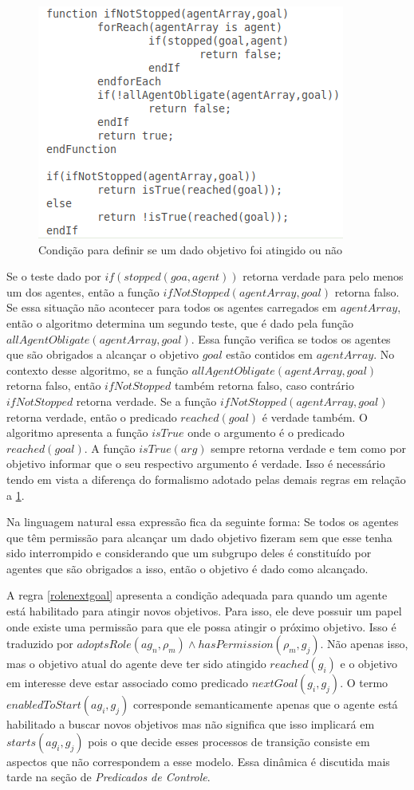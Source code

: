 \begin{figure}[H]
  \centering
  \includegraphics[width=0.6\linewidth]{figure/algrule6.png} 
  \caption{Condição para definir se um dado objetivo foi atingido ou não} \label{wenStop}  
\end{figure}

Se o teste dado por $if(stopped(goa,agent))$ retorna verdade para pelo menos um dos agentes, então a função $ifNotStopped(agentArray,goal)$ retorna falso. Se essa situação não acontecer para todos os agentes carregados em $agentArray$, então o algoritmo determina um segundo teste, que é dado pela função $allAgentObligate(agentArray,goal)$. Essa função verifica se todos os agentes que são obrigados a alcançar o objetivo $goal$ estão contidos em $agentArray$. No contexto desse algoritmo, se a função $allAgentObligate(agentArray,goal)$ retorna falso, então $ifNotStopped$ também retorna falso, caso contrário $ifNotStopped$ retorna verdade. Se a função $ifNotStopped(agentArray,goal)$ retorna verdade, então o predicado $reached(goal)$ é verdade também. O algoritmo apresenta a função $isTrue$ onde o argumento é o predicado $reached(goal)$. A função $isTrue(arg)$ sempre retorna verdade e tem como por objetivo informar que o seu respectivo argumento é verdade. Isso é necessário tendo em vista a diferença do formalismo adotado pelas demais regras em relação a \ref{wenStop}.

Na linguagem natural essa expressão fica da seguinte forma: Se todos os agentes que têm permissão para alcançar um dado objetivo fizeram sem que esse tenha sido interrompido e considerando que um subgrupo deles é constituído por agentes que são obrigados a isso, então o objetivo é dado como alcançado.

A regra \ref{rolenextgoal} apresenta a condição adequada para quando um agente está habilitado para atingir novos objetivos. Para isso, ele deve possuir um papel onde existe uma permissão para que ele possa atingir o próximo objetivo. Isso é traduzido por $ adoptsRole(ag_n,\rho_m) \wedge hasPermission(\rho_m,g_j) $. Não apenas isso, mas o objetivo atual do agente deve ter sido atingido $ reached(g_i) $ e o objetivo em interesse deve estar associado como predicado $nextGoal(g_i,g_j)$. O termo $enabledToStart(ag_i,g_j)$ corresponde semanticamente apenas que o agente está habilitado a buscar novos objetivos mas não significa que isso implicará em $starts(ag_i,g_j)$ pois o que decide esses processos de transição consiste em aspectos que não correspondem a esse modelo. Essa dinâmica é discutida mais tarde na seção de \textit{Predicados de Controle}.

